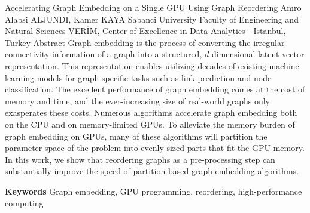 
    \begin{abstract_online}{Accelerating Graph Embedding on a Single GPU Using Graph Reordering}{%
        Amro Alabsi ALJUNDI, Kamer KAYA}{%
        }{%
        Sabanci University Faculty of Engineering and Natural Sciences \newline \noindent VERİM, Center of Excellence in Data Analytics - Istanbul, Turkey}
    Abstract-Graph embedding is the process of converting the irregular connectivity information of a graph into a structured, $d$-dimensional latent vector representation. This representation enables utilizing decades of existing machine learning models for graph-specific tasks such as link prediction and node classification. The excellent performance of graph embedding comes at the cost of memory and time, and the ever-increasing size of real-world graphs only exasperates these costs. Numerous algorithms accelerate graph embedding both on the CPU and on memory-limited GPUs. To alleviate the memory burden of graph embedding on GPUs, many of these algorithms will partition the parameter space of the problem into evenly sized parts that fit the GPU memory. In this work, we show that reordering graphs as a pre-processing step can substantially improve the speed of partition-based graph embedding algorithms. 
    
        \textbf{Keywords} \newline{}Graph embedding, GPU programming, reordering, high-performance computing
    \end{abstract_online}
    